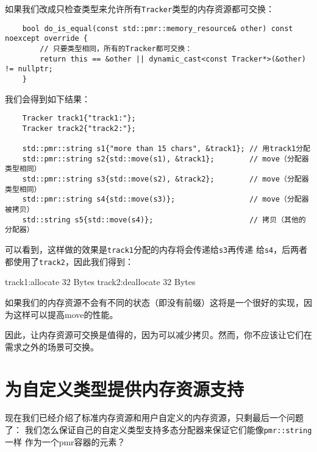 如果我们改成只检查类型来允许所有\texttt{Tracker}类型的内存资源都可交换：
\begin{lstlisting}
    bool do_is_equal(const std::pmr::memory_resource& other) const noexcept override {
        // 只要类型相同，所有的Tracker都可交换：
        return this == &other || dynamic_cast<const Tracker*>(&other) != nullptr;
    }
\end{lstlisting}
我们会得到如下结果：
\begin{lstlisting}
    Tracker track1{"track1:"};
    Tracker track2{"track2:"};

    std::pmr::string s1{"more than 15 chars", &track1}; // 用track1分配
    std::pmr::string s2{std::move(s1), &track1};        // move（分配器类型相同）
    std::pmr::string s3{std::move(s2), &track2};        // move（分配器类型相同）
    std::pmr::string s4{std::move(s3)};                 // move（分配器被拷贝）
    std::string s5{std::move(s4)};                      // 拷贝（其他的分配器）
\end{lstlisting}
可以看到，这样做的效果是\texttt{track1}分配的内存将会传递给\texttt{s3}再传递
给\texttt{s4}，后两者都使用了\texttt{track2}，因此我们得到：
\begin{blacklisting}
    track1:allocate 32 Bytes
    track2:deallocate 32 Bytes
\end{blacklisting}
如果我们的内存资源不会有不同的状态（即没有前缀）这将是一个很好的实现，因为这样可以提高move的性能。

因此，让内存资源可交换是值得的，因为可以减少拷贝。然而，你不应该让它们在需求之外的场景可交换。


\section{为自定义类型提供内存资源支持}\label{ch29.3}
现在我们已经介绍了标准内存资源和用户自定义的内存资源，只剩最后一个问题了：
我们怎么保证自己的自定义类型支持多态分配器来保证它们能像\texttt{pmr::string}一样
作为一个pmr容器的元素？

